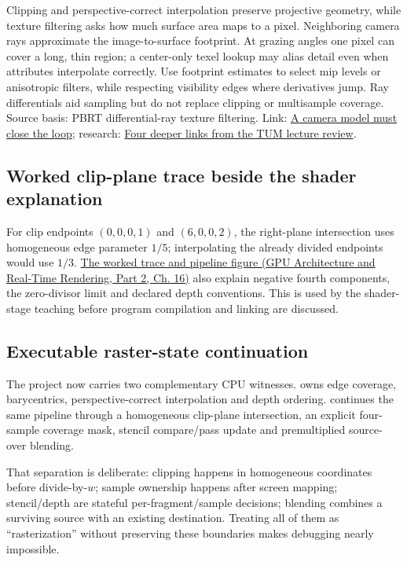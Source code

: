 Clipping and perspective-correct interpolation preserve projective geometry, while texture filtering asks how much surface area maps to a pixel. Neighboring camera rays approximate the image-to-surface footprint. At grazing angles one pixel can cover a long, thin region; a center-only texel lookup may alias detail even when attributes interpolate correctly. Use footprint estimates to select mip levels or anisotropic filters, while respecting visibility edges where derivatives jump. Ray differentials aid sampling but do not replace clipping or multisample coverage. Source basis: PBRT differential-ray texture filtering. Link: \hyperref[02-foundations-ii-ch037-a-camera-model-must-close-the-loop]{A camera model must close the loop}; research: \hyperref[02-foundations-ii-ch036-four-deeper-links-from-the-tum-lecture-review]{Four deeper links from the TUM lecture review}.

\subsection{Worked clip-plane trace beside the shader explanation}\label{appendix-40426e4b2103-worked-clip-plane-trace-beside-the-shader-explanation}

\hypertarget{appendix-40426e4b2103-worked-clip-plane-trace-beside-the-shader-explanation}{}

For clip endpoints \((0,0,0,1)\) and \((6,0,0,2)\), the right-plane intersection uses homogeneous edge parameter \(1/5\); interpolating the already divided endpoints would use \(1/3\). \href{../06-GPU-Architecture-and-Real-Time-Rendering-P02/main.pdf\#nameddest=06-engine-ii-ch025-clip-coordinates-are-not-normalized-device-coordinates}{The worked trace and pipeline figure (GPU Architecture and Real-Time Rendering, Part 2, Ch. 16)} also explain negative fourth components, the zero-divisor limit and declared depth conventions. This is used by the shader-stage teaching before program compilation and linking are discussed.

\subsection{Executable raster-state continuation}\label{appendix-40426e4b2103-executable-raster-state-continuation}

\hypertarget{appendix-40426e4b2103-executable-raster-state-continuation}{}

The project now carries two complementary CPU witnesses.  owns edge coverage, barycentrics, perspective-correct interpolation and depth ordering.  continues the same pipeline through a homogeneous clip-plane intersection, an explicit four-sample coverage mask, stencil compare/pass update and premultiplied source-over blending.

That separation is deliberate: clipping happens in homogeneous coordinates before divide-by-\(w\); sample ownership happens after screen mapping; stencil/depth are stateful per-fragment/sample decisions; blending combines a surviving source with an existing destination. Treating all of them as ``rasterization'' without preserving these boundaries makes debugging nearly impossible.
